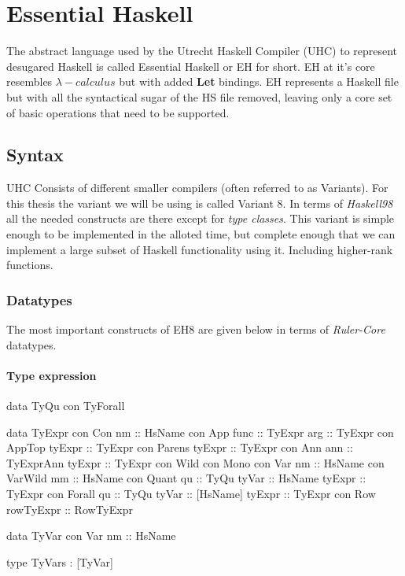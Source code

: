 \chapter{Essential Haskell}
The abstract language used by the Utrecht Haskell Compiler (UHC) to represent desugared Haskell is called Essential Haskell or EH for short. EH at it's core resembles $\lambda-calculus$ but with added \textbf{Let} bindings. EH represents a Haskell file but with all the syntactical sugar of the HS file removed, leaving only a core set of basic operations that need to be supported.
\section{Syntax}
UHC Consists of different smaller compilers (often referred to as Variants). For this thesis the variant we will be using is called Variant 8. In terms of \emph{Haskell98} all the needed constructs are there except for \emph{type classes}. This variant is simple enough to be implemented in the alloted time, but complete enough that we can implement a large subset of Haskell functionality using it. Including higher-rank functions.

\subsection{Datatypes}
 The most important constructs of EH8 are given below in terms of \emph{Ruler-Core} datatypes.

\subsubsection{Type expression}

\begin{code}
data TyQu
  con TyForall
    
data TyExpr
  con Con
    nm        :: HsName
  con App
    func      :: TyExpr
    arg       :: TyExpr
  con AppTop
    tyExpr    :: TyExpr
  con Parens
    tyExpr    :: TyExpr
  con Ann
    ann       :: TyExprAnn
    tyExpr    :: TyExpr
  con Wild
  con Mono
  con Var
    nm        :: HsName
  con VarWild
    mm        :: HsName
  con Quant
    qu        :: TyQu
    tyVar     :: HsName
    tyExpr    :: TyExpr
  con Forall
    qu        :: TyQu
    tyVar     :: [HsName]
    tyExpr    :: TyExpr    
  con Row
    rowTyExpr :: RowTyExpr
    
data TyVar
  con Var
    nm      :: HsName
    
type TyVars : [TyVar]
\end{code}

